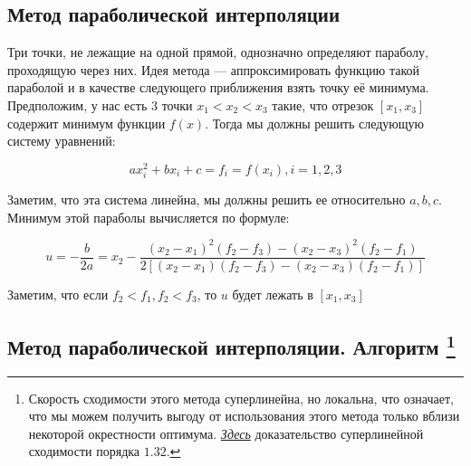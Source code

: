 \documentclass[
  russian,
  letterpaper,
  DIV=11,
  numbers=noendperiod]{scrartcl}
\begin{document}
\subsection{Метод параболической
интерполяции}\label{ux43cux435ux442ux43eux434-ux43fux430ux440ux430ux431ux43eux43bux438ux447ux435ux441ux43aux43eux439-ux438ux43dux442ux435ux440ux43fux43eux43bux44fux446ux438ux438}

Три точки, не лежащие на одной прямой, однозначно определяют параболу,
проходящую через них. Идея метода --- аппроксимировать функцию такой
параболой и в качестве следующего приближения взять точку её минимума.
Предположим, у нас есть 3 точки \(x_1 < x_2 < x_3\) такие, что отрезок
\([x_1, x_3]\) содержит минимум функции \(f(x)\). Тогда мы должны решить
следующую систему уравнений:

\[
ax_i^2 + bx_i + c = f_i = f(x_i), i = 1,2,3 
\]

Заметим, что эта система линейна, мы должны решить ее относительно
\(a,b,c\). Минимум этой параболы вычисляется по формуле:

\[
u = -\dfrac{b}{2a} = x_2 - \dfrac{(x_2 - x_1)^2(f_2 - f_3) - (x_2 - x_3)^2(f_2 - f_1)}{2\left[ (x_2 - x_1)(f_2 - f_3) - (x_2 - x_3)(f_2 - f_1)\right]}
\]

Заметим, что если \(f_2 < f_1, f_2 < f_3\), то \(u\) будет лежать в
\([x_1, x_3]\)

\subsection[Метод параболической интерполяции. Алгоритм
]{\texorpdfstring{Метод параболической интерполяции. Алгоритм
\footnote{Скорость сходимости этого метода суперлинейна, но локальна,
  что означает, что мы можем получить выгоду от использования этого
  метода только вблизи некоторой окрестности оптимума.
  \href{https://people.math.sc.edu/kellerlv/Quadratic_Interpolation.pdf}{\emph{Здесь}}
  доказательство суперлинейной сходимости порядка \(1.32\).}}{Метод параболической интерполяции. Алгоритм }}\label{ux43cux435ux442ux43eux434-ux43fux430ux440ux430ux431ux43eux43bux438ux447ux435ux441ux43aux43eux439-ux438ux43dux442ux435ux440ux43fux43eux43bux44fux446ux438ux438.-ux430ux43bux433ux43eux440ux438ux442ux43c-2}

\scriptsize
\end{document}
